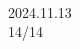 \documentclass[UTF8,10pt,a4paper,fontset=fandol]{ctexart}
\newcommand{\handwritten}[1]{#1}
\begin{document}
\vfill

\begin{flushright}
\handwritten{}\\[0.4em]
\handwritten{2024.11.13}\\[0.4em]
\handwritten{14/14}
\end{flushright}
\end{document}
